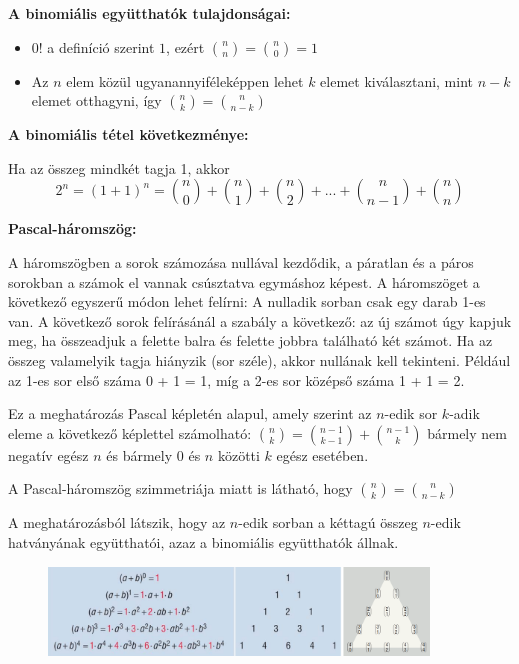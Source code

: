 \documentclass[12pt,a4paper]{article}
\begin{document}
\textbf{A binomiális együtthatók tulajdonságai:}
\begin{itemize}
\item $0!$ a definíció szerint $1$, ezért $\displaystyle\binom{n}{n}=\displaystyle\binom{n}{0}=1$
\item Az $n$ elem közül ugyanannyiféleképpen lehet $k$ elemet kiválasztani, mint $n - k$ elemet otthagyni, így $\displaystyle\binom{n}{k}=\displaystyle\binom{n}{n-k}$
\end{itemize}

\textbf{A binomiális tétel következménye:}

Ha az összeg mindkét tagja 1, akkor
\[2^n=(1+1)^n=\binom{n}{0}+\binom{n}{1}+\binom{n}{2}+...+\binom{n}{n-1}+\binom{n}{n}\]

\textbf{Pascal-háromszög:}

A háromszögben a sorok számozása nullával kezdődik, a páratlan és a páros sorokban a számok el vannak csúsztatva egymáshoz képest. A háromszöget a következő egyszerű módon lehet felírni: A nulladik sorban csak egy darab 1-es van. A következő sorok felírásánál a szabály a következő: az új számot úgy kapjuk meg, ha összeadjuk a felette balra és felette jobbra található két számot. Ha az összeg valamelyik tagja hiányzik (sor széle), akkor nullának kell tekinteni. Például az 1-es sor első száma 0 + 1 = 1, míg a 2-es sor középső száma 1 + 1 = 2.

Ez a meghatározás Pascal képletén alapul, amely szerint az $n$-edik sor $k$-adik eleme a következő képlettel számolható: $\displaystyle\binom{n}{k}=\displaystyle\binom{n-1}{k-1}+\displaystyle\binom{n-1}{k}$ bármely nem negatív egész $n$ és bármely 0 és $n$ közötti $k$ egész esetében.

A Pascal-háromszög szimmetriája miatt is látható, hogy $\displaystyle\binom{n}{k}=\displaystyle\binom{n}{n-k}$

A meghatározásból látszik, hogy az $n$-edik sorban a kéttagú összeg $n$-edik hatványának együtthatói, azaz a binomiális együtthatók állnak.
\begin{figure}[h]
\centering
\includegraphics[width=0.9\textwidth]{paszkal_haromszog}
\end{figure}
\end{document}
